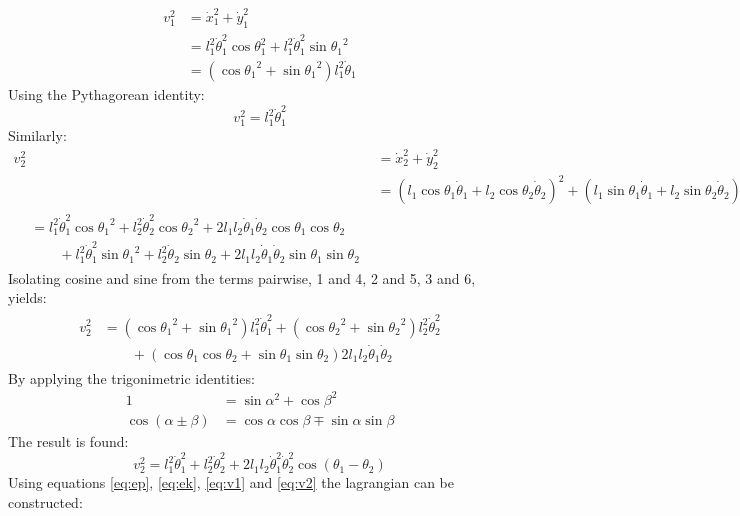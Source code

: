 \begin{align}
	v_1^2 &= \dot{x}_1^2+\dot{y}_1^2\\
		&= l_1^2\dot{\theta}_1^2\cos{\theta}_1^2+l_1^2\dot{\theta}_1^2\sin{\theta_1}^2\\
		&= (\cos{\theta_1}^2+\sin{\theta_1}^2)l_1^2\dot{\theta}_1
\end{align}
Using the Pythagorean identity:
\begin{equation}
	\label{eq:v1}
	v_1^2 = l_1^2\dot{\theta}_1^2
\end{equation}
Similarly:
\begin{align}
	v_2^2 &= \dot{x}_2^2+\dot{y}_2^2\\
	&= (l_1\cos{\theta}_1\dot{\theta}_1 + l_2\cos{\theta_2}\dot{\theta}_2)^2+(l_1\sin{\theta}_1\dot{\theta}_1 + l_2\sin{\theta_2}\dot{\theta}_2)^2\\
	\begin{split}
		&= l_1^2\dot\theta_1^2\cos{\theta_1}^2+l_2^2\dot\theta_2^2\cos{\theta_2}^2+2l_1l_2\dot\theta_1\dot\theta_2\cos{\theta_1}\cos{\theta_2}\\
		&\qquad +l_1^2\dot\theta_1^2\sin{\theta_1}^2+l_2^2\dot\theta_2\sin{\theta_2}+2l_1l_2\dot\theta_1\dot\theta_2\sin{\theta_1}\sin{\theta_2}
	\end{split}
\end{align}
Isolating cosine and sine from the terms pairwise, 1 and 4, 2 and 5, 3 and 6, yields:
\begin{align}
	\begin{split}
		v_2^2&=(\cos{\theta_1}^2+\sin{\theta_1}^2)l_1^2\dot\theta_1^2+(\cos{\theta_2}^2+\sin{\theta_2}^2)l_2^2\dot\theta_2^2\\
	&\qquad+(\cos{\theta_1}\cos{\theta_2}+\sin{\theta_1}\sin{\theta_2})2l_1l_2\dot\theta_1\dot\theta_2
	\end{split}
\end{align}
By applying the trigonimetric identities:
\begin{align}
	1&=\sin{\alpha^2}+\cos{\beta^2}\\
	\cos{(\alpha\pm\beta)}&=\cos\alpha\cos\beta\mp\sin\alpha\sin\beta
\end{align}
The result is found:
\begin{equation}
	\label{eq:v2}
	v_2^2=l_1^2\dot\theta_1^2+l_2^2\dot\theta_2^2+2l_1l_2\dot\theta_1^2\dot\theta_2^2\cos{(\theta_1-\theta_2)}
\end{equation}
Using equations \ref{eq:ep}, \ref{eq:ek}, \ref{eq:v1} and \ref{eq:v2} the lagrangian can be constructed:

